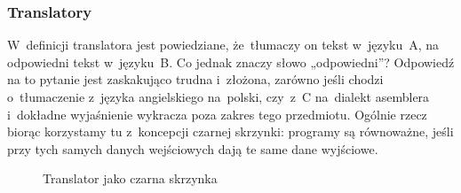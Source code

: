 \documentclass[10pt,t]{beamer}
\begin{document}
\begin{frame}
  \frametitle{Translatory}


  W~definicji translatora jest powiedziane, że~tłumaczy on tekst
  w~języku~A, na \alert{odpowiedni} tekst w~języku~B. Co jednak znaczy
  słowo „odpowiedni”? Odpowiedź na to pytanie jest zaskakująco trudna
  i~złożona, zarówno jeśli chodzi o~tłumaczenie z~języka angielskiego
  na~polski, czy~z~C na~dialekt asemblera i~dokładne wyjaśnienie wykracza
  poza zakres tego przedmiotu. Ogólnie rzecz biorąc korzystamy tu
  z~koncepcji czarnej skrzynki: programy są równoważne, jeśli przy tych
  samych danych wejściowych dają te same dane wyjściowe.






  \begin{figure}

    \label{fig:Translator-03}



    \caption{Translator jako czarna skrzynka}


  \end{figure}

\end{frame}
\end{document}
